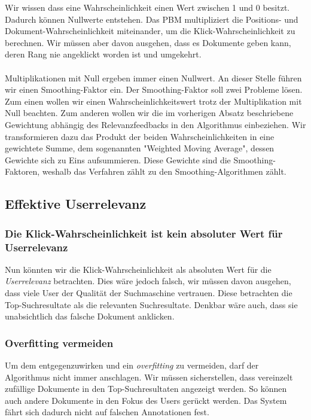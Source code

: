 Wir wissen dass eine Wahrscheinlichkeit einen Wert zwischen 1 und 0 besitzt. Dadurch können Nullwerte entstehen. Das PBM multipliziert die Positions- und Dokument-Wahrscheinlichkeit miteinander, um die Klick-Wahrscheinlichkeit zu berechnen. Wir müssen aber davon ausgehen, dass es Dokumente geben kann, deren Rang nie angeklickt worden ist und umgekehrt. 
\\
\\
Multiplikationen mit Null ergeben immer einen Nullwert. An dieser Stelle führen wir einen \glqq Smoothing-Faktor\grqq{} ein. Der Smoothing-Faktor soll zwei Probleme lösen. Zum einen wollen wir einen Wahrscheinlichkeitswert trotz der Multiplikation mit Null beachten. Zum anderen wollen wir die im vorherigen Absatz beschriebene Gewichtung abhängig des Relevanzfeedbacks in den Algorithmus einbeziehen. Wir transformieren dazu das Produkt der beiden Wahrscheinlichkeiten in eine gewichtete Summe, dem sogenannten "Weighted Moving Average", dessen Gewichte sich zu Eins aufsummieren. Diese Gewichte sind die Smoothing-Faktoren, weshalb das Verfahren zählt zu den Smoothing-Algorithmen zählt.

\subsection{Effektive Userrelevanz}
\label{sec:Einfuehrung:Methodik:Userrelevanz}

\subsubsection{Die Klick-Wahrscheinlichkeit ist kein absoluter Wert für Userrelevanz}
\label{sec:Einfuehrung:Methodik:Userrelevanz:Relevanzfeedback}

Nun könnten wir die Klick-Wahrscheinlichkeit als absoluten Wert für die \textit{Userrelevanz} betrachten. Dies wäre jedoch falsch, wir müssen davon ausgehen, dass viele User der Qualität der Suchmaschine vertrauen. Diese betrachten die Top-Suchresultate als die relevanten Suchresultate. Denkbar wäre auch, dass sie unabsichtlich das falsche Dokument anklicken.

\subsubsection{Overfitting vermeiden}
\label{sec:Einfuehrung:Methodik:Userrelevanz:Overfitting}

Um dem entgegenzuwirken und ein \textit{overfitting} zu vermeiden, darf der Algorithmus nicht immer anschlagen. Wir müssen sicherstellen, dass vereinzelt zufällige Dokumente in den \glqq Top-Suchresultaten\grqq{} angezeigt werden. So können auch andere Dokumente in den Fokus des Users gerückt werden. Das System fährt sich dadurch nicht auf falschen Annotationen fest. 

